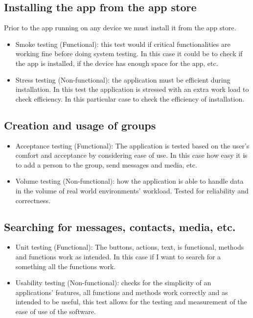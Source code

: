 \documentclass{article}
\begin{document}
\subsection{Installing the app from the app store}
Prior to the app running on any device we must install it from the app store.
\begin{itemize}
    \item Smoke testing (Functional): this test would if critical functionalities are working fine before doing system testing. In this case it could be to check if the app is installed, if the device has enough space for the app, etc. 
    \item Stress testing (Non-functional): the application must be efficient during installation. In this test the application is stressed with an extra work load to check efficiency. In this particular case to check the efficiency of installation. 
\end{itemize}

\subsection{Creation and usage of groups}
\begin{itemize}
    \item Acceptance testing (Functional): The application is tested based on the user's comfort and acceptance by considering ease of use. In this case how easy it is to add a person to the group, send messages and media, etc. 
    \item Volume testing (Non-functional): how the application is able to handle data in the volume of real world environments' workload. Tested for reliability and correctness. 
\end{itemize}

\subsection{Searching for messages, contacts, media, etc.}
\begin{itemize}
    \item Unit testing (Functional): The buttons, actions, text, is functional, methods and functions work as intended. In this case if I want to search for a something all the functions work. 
    \item Usability testing (Non-functional): checks for the simplicity of an applications' features, all functions and methods work correctly and as intended to be useful, this test allows for the testing and measurement of the ease of use of the software. 
\end{itemize}
\end{document}
